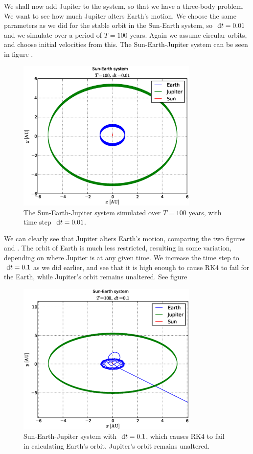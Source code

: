 
We shall now add Jupiter to the system, so that we have a three-body problem. We
want to see how much Jupiter alters Earth's motion. We choose the same
parameters as we did for the stable orbit in the Sun-Earth system, so $\ \mathrm{d}t =
0.01$ and we simulate over a period of $T = 100$ years. Again we assume circular
orbits, and choose initial velocities from this. The Sun-Earth-Jupiter
system can be seen in figure .
%
\begin{figure}[htpb]
	\centering
	\includegraphics[width=0.8\textwidth]{figures/sun_earth_jupiter_dt1e-2}
	\caption{The Sun-Earth-Jupiter system simulated over $T = 100$ years, with
	time step $\ \mathrm{d}t = 0.01$.}
	\label{fig:sunEarthJupiter}
\end{figure}
%
We can clearly see that Jupiter alters Earth's motion, comparing the two
figures  and . The orbit of Earth
is much less restricted, resulting in some variation, depending on where Jupiter
is at any given time. We increase the time step to $\ \mathrm{d}t = 0.1$ as
we did earlier, and see that it is high enough to cause RK4 to fail for the
Earth, while Jupiter's orbit remains unaltered. See figure
%
\begin{figure}[htpb]
	\centering
	\includegraphics[width=0.8\textwidth]{figures/sun_earth_jupiter_dt1e-1}
	\caption{Sun-Earth-Jupiter system with $\ \mathrm{d}t = 0.1$, which causes RK4 to fail
	in calculating Earth's orbit. Jupiter's orbit remains unaltered.}
	\label{fig:sunEarthJupiter-dt1e-2}
\end{figure}
